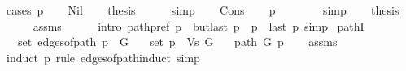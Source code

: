 \begin{isabellebody}
\endisataginvisible
{\isafoldinvisible}%
%
\isadeliminvisible
\isanewline
%
\endisadeliminvisible
%
\isadelimproof
%
\endisadelimproof
%
\isatagproof
{}\isamarkupfalse%
\ {\isacharparenleft}{\kern0pt}cases\ p{\isacharparenright}{\kern0pt}\isanewline
\ \ \isamarkupfalse%
\ Nil\isanewline
\ \ \isamarkupfalse%
\ {\isacharquery}{\kern0pt}thesis\isanewline
\ \ \ \ \isamarkupfalse%
\ simp\isanewline
{}\isamarkupfalse%
\isanewline
\ \ \isamarkupfalse%
\ Cons\isanewline
\ \ \isamarkupfalse%
\ {\isachardoublequoteopen}p\ {\isasymnoteq}\ {\isacharbrackleft}{\kern0pt}{\isacharbrackright}{\kern0pt}{\isachardoublequoteclose}\isanewline
\ \ \ \ \isamarkupfalse%
\ simp\isanewline
\ \ \isamarkupfalse%
\ {\isacharquery}{\kern0pt}thesis\isanewline
\ \ \ \ \isamarkupfalse%
\ assms\isanewline
\ \ \ \ \isamarkupfalse%
\ {\isacharparenleft}{\kern0pt}intro\ path{\isacharunderscore}{\kern0pt}pref{\isacharbrackleft}{\kern0pt}\ {\isacharquery}{\kern0pt}p{}{\isachardot}{\kern0pt}{}\ {\isacharequal}{\kern0pt}\ {\isachardoublequoteopen}butlast\ p{\isachardoublequoteclose}\ \ {\isacharquery}{\kern0pt}p{}{\isachardot}{\kern0pt}{}\ {\isacharequal}{\kern0pt}\ {\isachardoublequoteopen}{\isacharbrackleft}{\kern0pt}last\ p{\isacharbrackright}{\kern0pt}{\isachardoublequoteclose}{\isacharbrackright}{\kern0pt}{\isacharparenright}{\kern0pt}\ simp\isanewline
{}\isamarkupfalse%
%
\endisatagproof
{\isafoldproof}%
%
\isadelimproof
\isanewline
%
\endisadelimproof
\isanewline
{}\isamarkupfalse%
\ pathI{\isacharcolon}{\kern0pt}\isanewline
\ \ \ {\isachardoublequoteopen}set\ {\isacharparenleft}{\kern0pt}edges{\isacharunderscore}{\kern0pt}of{\isacharunderscore}{\kern0pt}path\ p{\isacharparenright}{\kern0pt}\ {\isasymsubseteq}\ G{\isachardoublequoteclose}\isanewline
\ \ \ {\isachardoublequoteopen}set\ p\ {\isasymsubseteq}\ Vs\ G{\isachardoublequoteclose}\isanewline
\ \ \ {\isachardoublequoteopen}path\ G\ p{\isachardoublequoteclose}\isanewline
%
\isadelimproof
\ \ %
\endisadelimproof
%
\isatagproof
{}\isamarkupfalse%
\ assms\isanewline
\ \ \isamarkupfalse%
\ {\isacharparenleft}{\kern0pt}induct\ p\ rule{\isacharcolon}{\kern0pt}\ edges{\isacharunderscore}{\kern0pt}of{\isacharunderscore}{\kern0pt}path{\isachardot}{\kern0pt}induct{\isacharparenright}{\kern0pt}\ simp{\isacharplus}{\kern0pt}%

\end{isabellebody}
